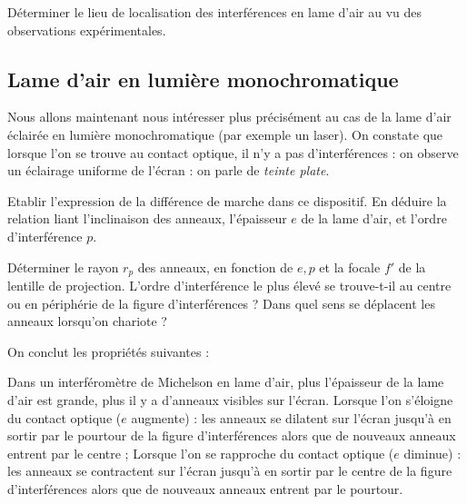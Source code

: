 \documentclass[11pt,fleqn]{book} %
\begin{document}
\begin{capex}
	Déterminer le lieu de localisation des interférences en lame d'air au vu des observations expérimentales.
\end{capex}

\subsection{Lame d'air en lumière monochromatique}

Nous allons maintenant nous intéresser plus précisément au cas de la lame d'air éclairée en lumière monochromatique (par exemple un laser). On constate que lorsque l'on se trouve au contact optique, il n'y a pas d'interférences : on observe un éclairage uniforme de l'écran : on parle de \textit{teinte plate}.

\begin{capex}
	Etablir l'expression de la différence de marche dans ce dispositif. En déduire la relation liant l'inclinaison des anneaux, l'épaisseur $e$ de la lame d'air, et l'ordre d'interférence $p$.
\end{capex}

\begin{capex}
	Déterminer le rayon $r_p$ des anneaux, en fonction de $e,p$ et la focale $f'$ de la lentille de projection.
	L'ordre d'interférence le plus élevé se trouve-t-il au centre ou en périphérie de la figure d'interférences ?
	Dans quel sens se déplacent les anneaux lorsqu'on chariote ?
\end{capex}

On conclut les propriétés suivantes :
\begin{proposition}
	Dans un interféromètre de Michelson en lame d’air, plus l’épaisseur de la lame d’air est grande, plus il y a d’anneaux visibles sur l’écran.
	Lorsque l’on s’éloigne du contact optique ($e$ augmente) : les anneaux se dilatent sur l’écran jusqu’à en sortir par le pourtour de la figure d’interférences alors que de nouveaux anneaux entrent par le centre ;
	Lorsque l’on se rapproche du contact optique ($e$ diminue) : les anneaux se contractent sur l’écran jusqu’à en sortir par le centre de la figure d’interférences alors que de nouveaux anneaux entrent par le pourtour.
\end{proposition}
\end{document}
